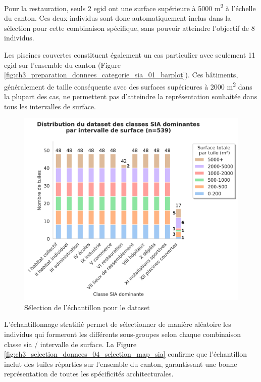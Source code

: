 Pour la restauration, seuls 2 \gls{egid} ont une surface supérieure à 5000 \si{\unit{\square\meter}} à l'échelle du canton. Ces deux individus sont donc automatiquement inclus dans la sélection pour cette combinaison spécifique, sans pouvoir atteindre l'objectif de 8 individus.

Les piscines couvertes constituent également un cas particulier avec seulement 11 \gls{egid} sur l'ensemble du canton (Figure \ref{fig:ch3_preparation_donnees_categorie_sia_01_barplot}). Ces bâtiments, généralement de taille conséquente avec des surfaces supérieures à 2000 \si{\unit{\square\meter}} dans la plupart des cas, ne permettent pas d'atteindre la représentation souhaitée dans tous les intervalles de surface.

\begin{figure}[H]
    \centering
    \includegraphics[width=1\linewidth]{02-main/figures/ch3/ch3_selection_donnees_03_selection_stacked.png}
    \caption{Sélection de l'échantillon pour le dataset}
    \label{fig:ch3_selection_donnees_03_selection_stacked}
\end{figure}

L'échantillonnage stratifié permet de sélectionner de manière aléatoire les individus qui formeront les différents sous-groupes selon chaque combinaison classe \gls{sia} / intervalle de surface. La Figure \ref{fig:ch3_selection_donnees_04_selection_map_sia} confirme que l'échantillon inclut des tuiles réparties sur l'ensemble du canton, garantissant une bonne représentation de toutes les spécificités architecturales.

